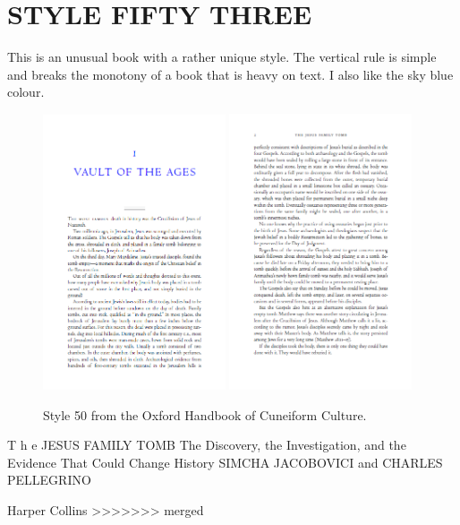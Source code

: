 \pagestyle{fancy}
\chapter{{STYLE FIFTY THREE}}


This is an unusual book with a rather unique style. The vertical rule is simple and breaks the monotony of a book that is heavy on text. I also like the sky blue colour.
\begin{figure}[ht]
\includegraphics[width=0.48\textwidth]{./chapters/chapter53}\hfill
\includegraphics[width=0.48\textwidth]{./chapters/chapter53a}
\caption{Style 50 from the Oxford Handbook of Cuneiform Culture.}
\end{figure}

T h e
JESUS
FAMILY
TOMB
The Discovery, the Investigation,
and the Evidence
That Could Change History
SIMCHA JACOBOVICI and CHARLES PELLEGRINO

Harper Collins
\lipsum
>>>>>>> merged
